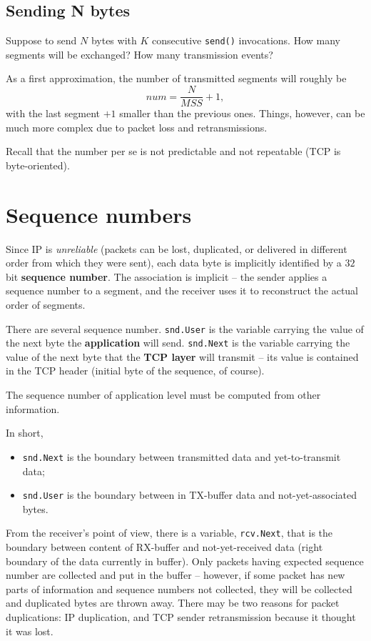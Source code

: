 \documentclass[a4paper, 12pt]{report}
\begin{document}
\subsection{Sending N bytes}

Suppose to send $N$ bytes with $K$ consecutive \texttt{send()} invocations. How
many segments will be exchanged? How many transmission events?

As a first approximation, the number of transmitted segments will roughly be
$$num = \frac{N}{MSS} + 1,$$ with the last segment $+1$ smaller than the
previous ones. Things, however, can be much more complex due to packet loss and
retransmissions.

Recall that the number per se is not predictable and not repeatable (TCP is
byte-oriented).

\section{Sequence numbers}

Since IP is \emph{unreliable} (packets can be lost, duplicated, or delivered in
different order from which they were sent), each data byte is implicitly
identified by a $32$ bit \textbf{sequence number}. The association is implicit
\--- the sender applies a sequence number to a segment, and the receiver uses
it to reconstruct the actual order of segments.

There are several sequence number. \texttt{snd.User} is the variable carrying
the value of the next byte the \textbf{application} will send.
\texttt{snd.Next} is the variable carrying the value of the next byte that the
\textbf{TCP layer} will transmit \--- its value is contained in the TCP header
(initial byte of the sequence, of course).

The sequence number of application level must be computed from other
information.

In short,

\begin{itemize}
	\item \texttt{snd.Next} is the boundary between transmitted data and
		yet-to-transmit data;
	\item \texttt{snd.User} is the boundary between in TX-buffer data and
		not-yet-associated bytes.
\end{itemize}

From the receiver's point of view, there is a variable, \texttt{rcv.Next}, that
is the boundary between content of RX-buffer and not-yet-received data (right
boundary of the data currently in buffer). Only packets having expected
sequence number are collected and put in the buffer \--- however, if some
packet has new parts of information and sequence numbers not collected, they
will be collected and duplicated bytes are thrown away. There may be two
reasons for packet duplications: IP duplication, and TCP sender retransmission
because it thought it was lost.
\end{document}
